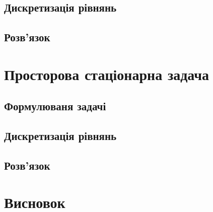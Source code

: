 \subsection{Дискретизація рівнянь}

\subsection{Розв'язок}

\section{Просторова стаціонарна задача}

\subsection{Формулюваня задачі}

\subsection{Дискретизація рівнянь}

\subsection{Розв'язок}

\section{Висновок}
